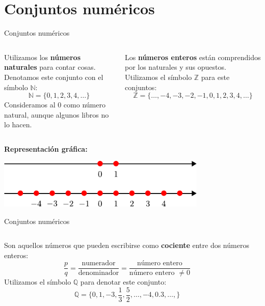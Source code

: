 \documentclass[9pt, aspectratio=169]{beamer}
\begin{document}
\section{Conjuntos numéricos}

\begin{frame}{Conjuntos numéricos}
\begin{columns}[t]
\cx
\begin{definition}
    Utilizamos los \textbf{números naturales} para contar cosas. Denotamos este conjunto con el símbolo $\mathbb{N}$:
\[ \mathbb{N} = \{0, 1, 2, 3, 4, \ldots \} \]
Consideramos al $0$ como número natural, aunque algunos libros no lo hacen.
\end{definition}
\cx
\begin{definition}
    Los \textbf{números enteros} están comprendidos por los naturales y sus opuestos. Utilizamos el símbolo $\mathbb{Z}$ para este conjuntos:
\[ \mathbb{Z} = \{\ldots, -4, -3, -2, -1, 0, 1, 2, 3, 4, \ldots \} \]
\end{definition}
\end{columns}

\textbf{Representación gráfica:}
\begin{center}
    \includegraphics[width=0.75\textwidth]{figs/fig-12.pdf}
\end{center}
\end{frame}

\begin{frame}{Conjuntos numéricos}
    \begin{columns}[c]
\cx
\begin{definition}
    Son aquellos números que pueden escribirse como \textbf{cociente} entre dos números enteros:
    \[ \frac{p}{q} = \frac{\text{numerador}}{\text{denominador}} = \frac{\text{número entero}}{\text{número entero } \neq 0} \]
    Utilizamos el símbolo $\mathbb{Q}$ para denotar este conjunto: 
    \[ \mathbb{Q} = \{ 0, 1, -3, \frac{1}{3}, \frac{5}{2}, \ldots, -4, 0.3, \ldots, \} \]
\end{definition}
\cx
\begin{center}
    
\end{center}
\end{columns}
\end{frame}
\end{document}
